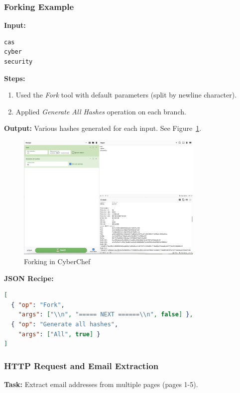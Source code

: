 \subsubsection{Forking Example}
\textbf{Input:}
\begin{verbatim}
cas
cyber
security
\end{verbatim}

\textbf{Steps:}
\begin{enumerate}
    \item Used the \emph{Fork} tool with default parameters (split by newline character).
    \item Applied \emph{Generate All Hashes} operation on each branch.
\end{enumerate}

\textbf{Output:} Various hashes generated for each input. See Figure~\ref{fig:forking}.

\begin{figure}[h!]
    \centering
    \includegraphics[width=0.8\textwidth]{resources/01_forking_CyberChef.png}
    \caption{Forking in CyberChef}
    \label{fig:forking}
\end{figure}

\textbf{JSON Recipe:}
\begin{lstlisting}[language=json,caption=Forking JSON Recipe]
[
  { "op": "Fork",
    "args": ["\\n", "===== NEXT ======\\n", false] },
  { "op": "Generate all hashes",
    "args": ["All", true] }
]
\end{lstlisting}

\subsubsection{HTTP Request and Email Extraction}
\textbf{Task:} Extract email addresses from multiple pages (pages 1-5).

